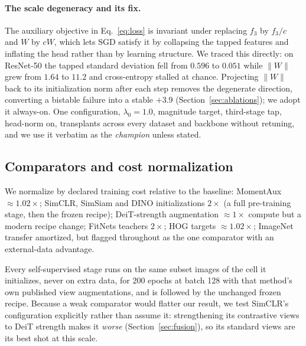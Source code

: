 \paragraph{The scale degeneracy and its fix.} The auxiliary objective in
Eq.~\ref{eq:loss} is invariant under replacing $f_3$ by $f_3/c$ and $W$ by $cW$,
which lets SGD satisfy it by collapsing the tapped features and inflating
the head rather than by learning structure. We traced this directly:
on ResNet-50 the tapped standard deviation fell from $0.596$ to $0.051$ while
$\lVert W\rVert$ grew from $1.64$ to $11.2$ and cross-entropy stalled at
chance. Projecting $\lVert W \rVert$ back to its initialization norm after
each step removes the degenerate direction, converting a bistable failure
into a stable $+3.9$ (Section~\ref{sec:ablations}); we adopt it always-on.
One configuration, $\lambda_0{=}1.0$, magnitude target, third-stage tap,
head-norm on, transplants across every dataset and backbone without
retuning, and we use it verbatim as the \emph{champion} unless stated.

\subsection{Comparators and cost normalization}\label{sec:comparators}
We normalize by declared training cost relative to the baseline:
MomentAux ${\approx}1.02\times$; SimCLR, SimSiam and DINO initializations
$2\times$ (a full pre-training stage, then the frozen recipe);
DeiT-strength augmentation \citep{touvron2021deit} ${\approx}1\times$
compute but a modern recipe change; FitNets teachers $2\times$; HOG
targets ${\approx}1.02\times$; ImageNet transfer amortized, but flagged
throughout as the one comparator with an external-data advantage.

Every self-supervised stage runs on the same subset images of the
cell it initializes, never on extra data, for 200 epochs at batch
128 with that method's own published view augmentations, and is followed
by the unchanged frozen recipe. Because a weak comparator would flatter
our result, we test SimCLR's configuration explicitly rather than assume
it: strengthening its contrastive views to DeiT strength makes it
\emph{worse} (Section~\ref{sec:fusion}), so its standard views are its best
shot at this scale.

